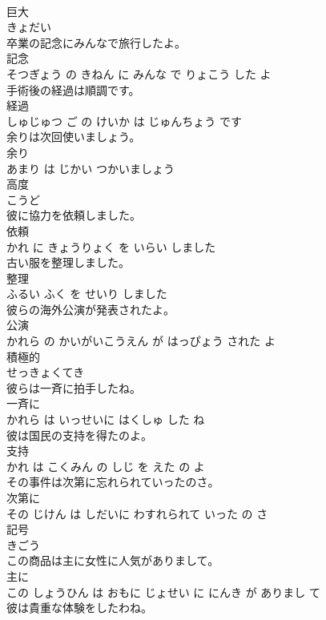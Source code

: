 \documentclass[8pt]{extreport}
\begin{document}
\begin{CJK}{UTF8}{min}
\\	巨大	
\\	きょだい		
\\	卒業の記念にみんなで旅行したよ。	
\\	記念 
\\	そつぎょう の きねん に みんな で りょこう した よ		
\\	手術後の経過は順調です。	
\\	経過 
\\	しゅじゅつ ご の けいか は じゅんちょう です		
\\	余りは次回使いましょう。	
\\	余り 
\\	あまり は じかい つかいましょう		
\\	高度	
\\	こうど		
\\	彼に協力を依頼しました。	
\\	依頼 
\\	かれ に きょうりょく を いらい しました		
\\	古い服を整理しました。	
\\	整理 
\\	ふるい ふく を せいり しました		
\\	彼らの海外公演が発表されたよ。	
\\	公演 
\\	かれら の かいがいこうえん が はっぴょう された よ		
\\	積極的	
\\	せっきょくてき		
\\	彼らは一斉に拍手したね。	
\\	一斉に 
\\	かれら は いっせいに はくしゅ した ね		
\\	彼は国民の支持を得たのよ。	
\\	支持 
\\	かれ は こくみん の しじ を えた の よ		
\\	その事件は次第に忘れられていったのさ。	
\\	次第に 
\\	その じけん は しだいに わすれられて いった の さ		
\\	記号	
\\	きごう		
\\	この商品は主に女性に人気がありまして。	
\\	主に 
\\	この しょうひん は おもに じょせい に にんき が ありまし て		
\\	彼は貴重な体験をしたわね。	

\end{CJK}
\end{document}
